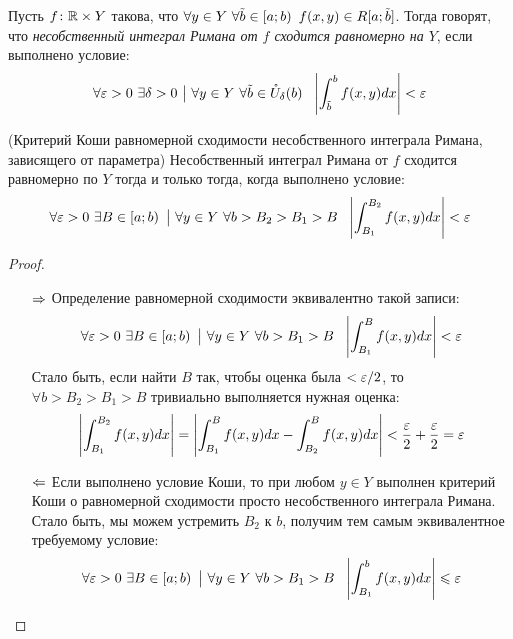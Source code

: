 \begin{definition}
	Пусть $f \colon \mathbb{R} \times Y$ такова, что $\forall y \in Y\ \forall \tilde{b} \in \left[a; b\right)\ f(x, y) \in R[a; \tilde{b}]$. Тогда говорят, что \textit{несобственный интеграл Римана от $f$ сходится равномерно на $Y$}, если выполнено условие:
	\[
		\forall \varepsilon > 0\ \exists \delta > 0 \ \big|\  \forall y \in Y\ \forall \tilde{b} \in \mathring{U}_\delta(b)\ \ \left|\int_{\tilde{b}}^b f(x, y)dx\right| < \varepsilon
	\]
\end{definition}

\begin{theorem} (Критерий Коши равномерной сходимости несобственного интеграла Римана, зависящего от параметра)
	Несобственный интеграл Римана от $f$ сходится равномерно по $Y$ тогда и только тогда, когда выполнено условие:
	\[
		\forall \eps > 0\ \exists B \in \lsi{a; b} \such \forall y \in Y\ \forall b > B_2 > B_1 > B\ \ \md{\int_{B_1}^{B_2} f(x, y)dx} < \eps
	\]
\end{theorem}

\begin{proof}~
	\begin{itemize}
		\item[$\Rightarrow$] Определение равномерной сходимости эквивалентно такой записи:
		\[
			\forall \varepsilon > 0\ \exists B \in \left[a; b\right) \ \big|\  \forall y \in Y\ \forall b > B_1 > B\ \ \left|\int_{B_1}^B f(x, y)dx\right| < \varepsilon
		\]
		Стало быть, если найти $B$ так, чтобы оценка была $< \varepsilon / 2$, то $\forall b > B_2 > B_1 > B$ тривиально выполняется нужная оценка:
		\[
			\left|\int_{B_1}^{B_2} f(x, y)dx\right| = \left|\int_{B_1}^B f(x, y)dx - \int_{B_2}^B f(x, y)dx\right| < \frac{\varepsilon}{2} + \frac{\varepsilon}{2} = \varepsilon
		\]
		
		\item[$\Leftarrow$] Если выполнено условие Коши, то при любом $y \in Y$ выполнен критерий Коши о равномерной сходимости просто несобственного интеграла Римана. Стало быть, мы можем устремить $B_2$ к $b$, получим тем самым эквивалентное требуемому условие:
		\[
			\forall \varepsilon > 0\ \exists B \in \left[a; b\right) \ \big|\  \forall y \in Y\ \forall b > B_1 > B\ \ \left|\int_{B_1}^b f(x, y)dx\right| \leqslant \varepsilon
		\]
	\end{itemize}
\end{proof}